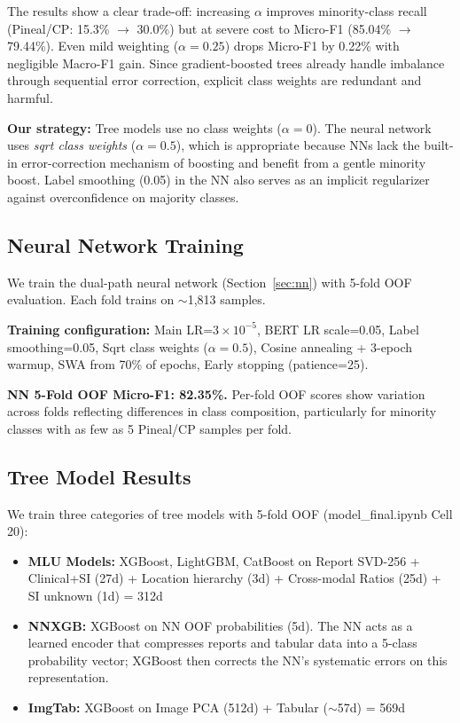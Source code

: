 The results show a clear trade-off: increasing $\alpha$ improves minority-class recall (Pineal/CP: 15.3\% $\to$ 30.0\%) but at severe cost to Micro-F1 (85.04\% $\to$ 79.44\%). Even mild weighting ($\alpha=0.25$) drops Micro-F1 by 0.22\% with negligible Macro-F1 gain. Since gradient-boosted trees already handle imbalance through sequential error correction, explicit class weights are redundant and harmful.

\textbf{Our strategy:} Tree models use no class weights ($\alpha=0$). The neural network uses \emph{sqrt class weights} ($\alpha=0.5$), which is appropriate because NNs lack the built-in error-correction mechanism of boosting and benefit from a gentle minority boost. Label smoothing (0.05) in the NN also serves as an implicit regularizer against overconfidence on majority classes.

\subsection{Neural Network Training}

We train the dual-path neural network (Section~\ref{sec:nn}) with 5-fold OOF evaluation. Each fold trains on $\sim$1,813 samples.

\textbf{Training configuration:} Main LR=$3\times10^{-5}$, BERT LR scale=0.05, Label smoothing=0.05, Sqrt class weights ($\alpha=0.5$), Cosine annealing + 3-epoch warmup, SWA from 70\% of epochs, Early stopping (patience=25).

\textbf{NN 5-Fold OOF Micro-F1: 82.35\%.} Per-fold OOF scores show variation across folds reflecting differences in class composition, particularly for minority classes with as few as 5 Pineal/CP samples per fold.

\subsection{Tree Model Results}

We train three categories of tree models with 5-fold OOF (model\_final.ipynb Cell 20):

\begin{itemize}
  \item \textbf{MLU Models:} XGBoost, LightGBM, CatBoost on Report SVD-256 + Clinical+SI (27d) + Location hierarchy (3d) + Cross-modal Ratios (25d) + SI unknown (1d) = 312d
  \item \textbf{NNXGB:} XGBoost on NN OOF probabilities (5d). The NN acts as a learned encoder that compresses reports and tabular data into a 5-class probability vector; XGBoost then corrects the NN's systematic errors on this representation.
  \item \textbf{ImgTab:} XGBoost on Image PCA (512d) + Tabular ($\sim$57d) = 569d
\end{itemize}

